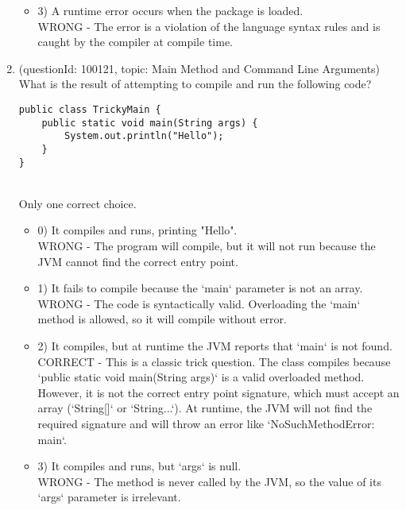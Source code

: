 \documentclass[12pt]{article}
\begin{document}
\begin{enumerate}[label=(\arabic*)]
\begin{itemize}
\item 3) A runtime error occurs when the package is loaded.
 \\ 
WRONG - The error is a violation of the language syntax rules and is caught by the compiler at compile time.

\end{itemize}
\item (questionId: 100121, topic: Main Method and Command Line Arguments) \\ 
What is the result of attempting to compile and run the following code?
\begin{verbatim}
public class TrickyMain {
    public static void main(String args) {
        System.out.println("Hello");
    }
}
\end{verbatim}
\\ \noindent Only one correct choice. 
\begin{itemize}
\item 0) It compiles and runs, printing "Hello".
 \\ 
WRONG - The program will compile, but it will not run because the JVM cannot find the correct entry point.

\item 1) It fails to compile because the `main` parameter is not an array.
 \\ 
WRONG - The code is syntactically valid. Overloading the `main` method is allowed, so it will compile without error.

\item 2) It compiles, but at runtime the JVM reports that `main` is not found.
 \\ 
CORRECT - This is a classic trick question. The class compiles because `public static void main(String args)` is a valid overloaded method. However, it is not the correct entry point signature, which must accept an array (`String[]` or `String...`). At runtime, the JVM will not find the required signature and will throw an error like `NoSuchMethodError: main`.

\item 3) It compiles and runs, but `args` is null.
 \\ 
WRONG - The method is never called by the JVM, so the value of its `args` parameter is irrelevant.


\end{itemize}
\end{enumerate}
\end{document}
